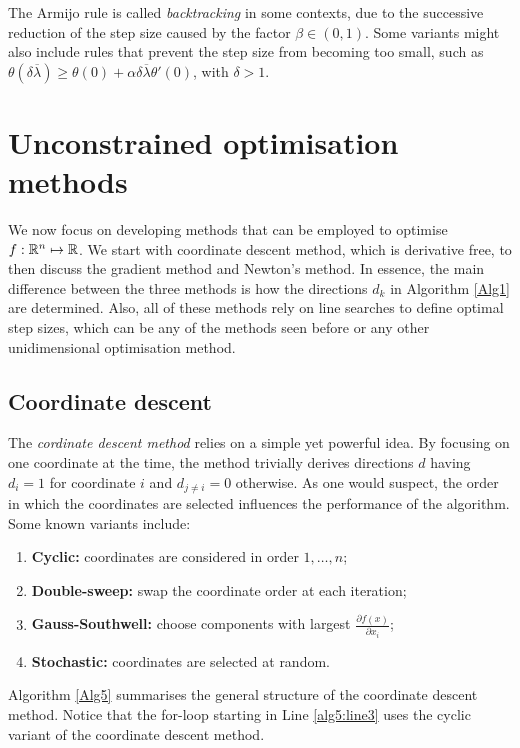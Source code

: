 The Armijo rule is called \emph{backtracking} in some contexts, due to the successive reduction of the step size caused by the factor $\beta \in (0,1)$. Some variants might also include rules that prevent the step size from becoming too small, such as $\theta(\delta\overline{\lambda}) \geq \theta(0) + \alpha \delta\overline{\lambda}\theta'(0)$, with $\delta > 1$.
    
\section{Unconstrained optimisation methods}

We now focus on developing methods that can be employed to optimise $f: \mathbb{R}^n \mapsto \mathbb{R}$. We start with coordinate descent method, which is derivative free, to then discuss the gradient method and Newton's method. In essence, the main difference between the three methods is how the directions $d_k$ in Algorithm \ref{Alg1} are determined. Also, all of these methods rely on line searches to define optimal step sizes, which can be any of the methods seen before or any other unidimensional optimisation method.

\subsection{Coordinate descent}

The \emph{cordinate descent method} relies on a simple yet powerful idea. By focusing on one coordinate at the time, the method trivially derives directions $d$ having $d_i = 1$ for coordinate $i$ and $d_{j \neq i} = 0$ otherwise. As one would suspect, the order in which the coordinates are selected influences the performance of the algorithm. Some known variants include:
%
\begin{enumerate}
\item {\bf Cyclic:} coordinates are considered in order $1,\dots,n$;
\item {\bf Double-sweep:} swap the coordinate order at each iteration;
\item {\bf Gauss-Southwell:} choose components with largest $\frac{\partial f(x)}{\partial x_i}$;
\item {\bf Stochastic:} coordinates are selected at random.
\end{enumerate}
  

Algorithm \ref{Alg5} summarises the general structure of the coordinate descent method. Notice that the for-loop starting in Line \ref{alg5:line3} uses the cyclic variant of the coordinate descent method. 

